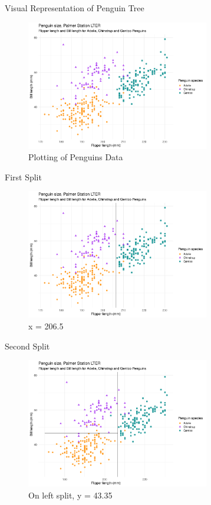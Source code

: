 \documentclass[12pt]{beamer}
\begin{document}
\begin{frame}{Visual Representation of Penguin Tree}
    \begin{figure}
        \centering
        \includegraphics[width = 8cm]{presentation/plotpen.pdf}
        \caption{Plotting of Penguins Data}
        \label{fig:penplot}
    \end{figure}
\end{frame}

\begin{frame}{First Split}
    \begin{figure}
        \centering
        \includegraphics[width = 8cm]{presentation/plotpen1.pdf}
        \caption{x = 206.5}
        \label{fig:pen1}
    \end{figure}
\end{frame}

\begin{frame}{Second Split}
    \begin{figure}
        \centering
        \includegraphics[width = 8cm]{presentation/plotpen2.pdf}
        \caption{On left split, y = 43.35}
        \label{fig:pen2}
    \end{figure}
\end{frame}
\end{document}
